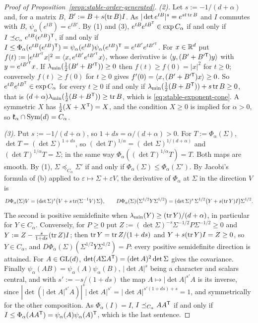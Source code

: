 \begin{proof}[Proof of Proposition~\ref{prop:stable-order-generated}]
\emph{(2).} Let $s := -1/(d+\alpha)$ and, for a matrix $B$, $B' := B + s(\operatorname{tr} B)I$. As
$|\det e^{tB}|^s = e^{st\operatorname{tr} B}$ and $I$ commutes with $B$, $\psi_\alpha(e^{tB}) = e^{tB'}$. By (1) and (3),
$e^{tB}e^{tB^{\mathsf{T}}} \in \exp C_\alpha$ if and only if $I \preceq_{C_\alpha} e^{tB}(e^{tB})^{\mathsf{T}}$, if and only if
$I \le \Phi_\alpha(e^{tB}(e^{tB})^{\mathsf{T}}) = \psi_\alpha(e^{tB})\psi_\alpha(e^{tB})^{\mathsf{T}} = e^{tB'}e^{tB'^{\mathsf{T}}}$.
For $x \in \mathbb{R}^d$ put $f(t) := |e^{tB'^{\mathsf{T}}}x|^2 = \langle x, e^{tB'}e^{tB'^{\mathsf{T}}}x\rangle$, whose derivative
is $\langle y, (B' + B'^{\mathsf{T}})y\rangle$ with $y = e^{tB'^{\mathsf{T}}}x$. If $\lambda_{\min}(\frac12(B' + B'^{\mathsf{T}}))
\ge 0$ then $f(t) \ge f(0) = |x|^2$ for $t \ge 0$; conversely $f(t) \ge f(0)$ for $t \ge 0$ gives
$f'(0) = \langle x, (B' + B'^{\mathsf{T}})x\rangle \ge 0$. So $e^{tB}e^{tB^{\mathsf{T}}} \in \exp C_\alpha$ for every
$t \ge 0$ if and only if $\lambda_{\min}(\frac12(B + B^{\mathsf{T}})) + s\operatorname{tr} B \ge 0$, that is
$(d+\alpha)\lambda_{\min}(\frac12(B + B^{\mathsf{T}})) \ge \operatorname{tr} B$, which is \ref{eq:stable-exponent-cone}. A symmetric
$X$ has $\frac12(X + X^{\mathsf{T}}) = X$, and the condition $X \ge 0$ is implied for $\alpha > 0$, so
$\mathfrak k_\alpha \cap \mathrm{Sym}(d) = C_\alpha$.

\emph{(3).} Put $s := -1/(d+\alpha)$, so $1 + ds = \alpha/(d+\alpha) > 0$. For $T := \Phi_\alpha(\Sigma)$,
$\det T = (\det\Sigma)^{1+ds}$, so $(\det T)^{1/\alpha} = (\det\Sigma)^{1/(d+\alpha)}$ and
$(\det T)^{1/\alpha}T = \Sigma$; in the same way $\Phi_\alpha((\det T)^{1/\alpha}T) = T$. Both maps are
smooth. By (1), $\Sigma \preceq_{C_\alpha} \Sigma'$ if and only if $\Phi_\alpha(\Sigma) \le \Phi_\alpha(\Sigma')$.
By Jacobi's formula of (b) applied to $\varepsilon \mapsto \Sigma + \varepsilon V$, the derivative of
$\Phi_\alpha$ at $\Sigma$ in the direction $V$ is
\[
  D\Phi_\alpha(\Sigma)V = (\det\Sigma)^s\bigl(V + s\operatorname{tr}(\Sigma^{-1}V)\,\Sigma\bigr) ,
  \qquad
  D\Phi_\alpha(\Sigma)\bigl(\Sigma^{1/2}Y\Sigma^{1/2}\bigr) = (\det\Sigma)^s\,\Sigma^{1/2}\bigl(Y + s(\operatorname{tr} Y)I\bigr)\Sigma^{1/2} .
\]
The second is positive semidefinite when $\lambda_{\min}(Y) \ge (\operatorname{tr} Y)/(d+\alpha)$, in particular for
$Y \in C_\alpha$. Conversely, for $P \ge 0$ put $Z := (\det\Sigma)^{-s}\Sigma^{-1/2}P\Sigma^{-1/2} \ge 0$ and
$Y := Z - \frac{s}{1+ds}(\operatorname{tr} Z)I$; then $\operatorname{tr} Y = \operatorname{tr} Z/(1+ds)$ and $Y + s(\operatorname{tr} Y)I = Z \ge 0$, so $Y \in
C_\alpha$, and $D\Phi_\alpha(\Sigma)(\Sigma^{1/2}Y\Sigma^{1/2}) = P$: every positive semidefinite direction is
attained.
For $A \in \mathrm{GL}(d)$, $\det(A\Sigma A^{\mathsf{T}}) = (\det A)^2\det\Sigma$ gives the covariance. Finally
$\psi_\alpha(AB) = \psi_\alpha(A)\psi_\alpha(B)$, $|\det A|^s$ being a character and scalars central, and with
$s' := -s/(1+ds)$ the map $A \mapsto |\det A|^{s'}A$ is its inverse, since $|\det(|\det A|^{s'}A)|^s|\det A|^{s'} =
|\det A|^{s'(1+ds) + s} = 1$, and symmetrically for the other composition. As $\Phi_\alpha(I) = I$, $I \preceq_{C_\alpha} AA^{\mathsf{T}}$ if and only if
$I \le \Phi_\alpha(AA^{\mathsf{T}}) = \psi_\alpha(A)\psi_\alpha(A)^{\mathsf{T}}$, which is the last sentence.
\end{proof}

